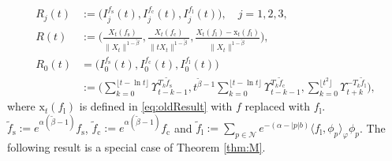 \documentclass[12pt,a4paper]{amsart}
\theoremstyle{plain}
\theoremstyle{definition}
\numberwithin{equation}{section}
\begin{document}
	\begin{align}
	R_j(t)&:=\big(I_j^{f_\mathrm s}(t),I_j^{f_\mathrm c}(t),I_j^{f_\mathrm l}(t)\big), \quad j = 1,2,3,
	\\ R(t)&:=\Big( \frac{X_t(f_\mathrm s)}{\|X_t\|^{1-\tilde \beta}},\frac{X_t(f_\mathrm c)}{\|tX_t\|^{1-\tilde \beta}},\frac{ X_t(f_\mathrm l) - \mathrm x_t(f_\mathrm l)}{\|X_t\|^{1-\tilde \beta}}\Big),
    \\R_0(t)&=\big(I_0^{f_\mathrm s}(t),I_0^{f_\mathrm c}(t),I_0^{f_\mathrm l}(t)\big)
       \\&:=\Big(\sum_{k=0}^{\lfloor t-\ln t \rfloor} \Upsilon_{t-k-1}^{T_k \tilde f_\mathrm s},t^{\tilde \beta - 1}\sum_{k=0}^{\lfloor t-\ln t \rfloor} \Upsilon_{t-k-1}^{T_{k} \tilde f_\mathrm c},\sum_{k = 0}^{\lfloor t^2 \rfloor} \Upsilon_{t+k}^{- T_k \tilde f_\mathrm l}\Big),
\end{align}
where 
 $\mathrm x_t(f_\mathrm l)$ is defined in \eqref{eq:oldResult} with $f$ replaced with $f_\mathrm l$.
$\tilde f_\mathrm s:=e^{\alpha(\tilde \beta - 1)} f_\mathrm s$, $\tilde f_\mathrm c:=e^{\alpha(\tilde \beta - 1)} f_\mathrm c$ and  $\tilde f_\mathrm l := \sum_{p\in \mathcal N} e^{-(\alpha - |p|b)}\langle f_\mathrm l, \phi_p \rangle_\varphi \phi_p$.
The following result is a special case of Theorem \ref{thm:M}.
\end{document}
